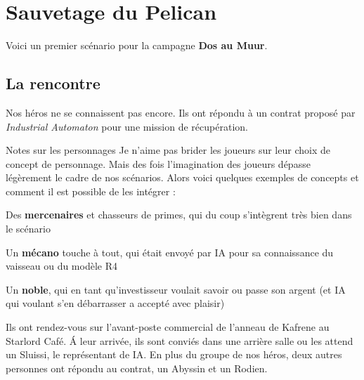 \section{Sauvetage du Pelican}

Voici un premier scénario pour la campagne \textbf{Dos au Muur}. 

\subsection{La rencontre}
Nos héros ne se connaissent pas encore. Ils ont répondu à un contrat proposé par \emph{Industrial Automaton} pour une mission de récupération.

\begin{paperbox}{Notes sur les personnages}
	Je n’aime pas brider les joueurs sur leur choix de concept de personnage. Mais des fois l’imagination des joueurs dépasse légèrement le cadre de nos scénarios. Alors voici quelques exemples de concepts et comment il est possible de les intégrer :
	\begin{rebelist}
		\item Des \textbf{mercenaires} et chasseurs de primes, qui du coup s’intègrent très bien dans le scénario
		\item Un \textbf{mécano} touche à tout, qui était envoyé par IA pour sa connaissance du vaisseau ou du modèle R4
		\item Un \textbf{noble}, qui en tant qu’investisseur voulait savoir ou passe son argent (et IA qui voulant s’en débarrasser a accepté avec plaisir)
	\end{rebelist}
\end{paperbox}

Ils ont rendez-vous sur l’avant-poste commercial de l’anneau de Kafrene au Starlord Café. \'A leur arrivée, ils sont conviés dans une arrière salle ou les attend  un Sluissi, le représentant de IA. En plus du groupe de nos héros, deux autres personnes ont répondu au contrat, un Abyssin et un Rodien.

